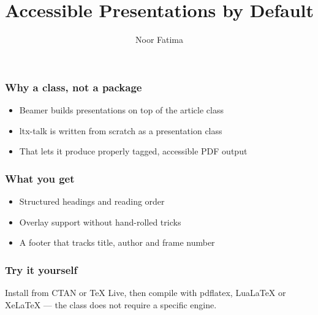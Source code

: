 \documentclass{ltx-talk}
\title{Accessible Presentations by Default}
\author{Noor Fatima}
\begin{document}
\begin{frame}
  \maketitle
\end{frame}

\begin{frame}
  \frametitle{Why a class, not a package}
  \begin{itemize}[<+->]
    \item Beamer builds presentations on top of the article class
    \item ltx-talk is written from scratch as a presentation class
    \item That lets it produce properly tagged, accessible PDF output
  \end{itemize}
\end{frame}

\begin{frame}
  \frametitle{What you get}
  \begin{itemize}
    \item Structured headings and reading order
    \item Overlay support without hand-rolled tricks
    \item A footer that tracks title, author and frame number
  \end{itemize}
\end{frame}

\begin{frame}
  \frametitle{Try it yourself}
  Install from CTAN or TeX Live, then compile with pdflatex, LuaLaTeX or
  XeLaTeX --- the class does not require a specific engine.
\end{frame}
\end{document}
